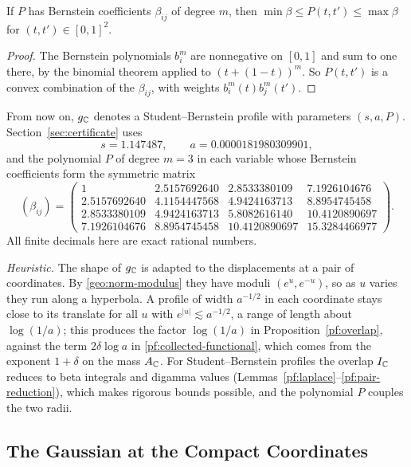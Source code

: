 \begin{lemma}\label{pf:bernstein-bounds}
If $P$ has Bernstein coefficients $\beta_{ij}$ of degree $m$, then
$\min\beta\le P(t,t')\le\max\beta$ for $(t,t')\in[0,1]^2$.
\end{lemma}

\begin{proof}
The Bernstein polynomials $b_i^m$ are nonnegative on $[0,1]$ and sum to
one there, by the binomial theorem applied to $(t+(1-t))^m$. So $P(t,t')$ is
a convex combination of the $\beta_{ij}$, with weights
$b_i^m(t)b_j^m(t')$.
\end{proof}

From now on, $g_\mathbb C$ denotes a Student--Bernstein profile with parameters
$(s,a,P)$. Section~\ref{sec:certificate} uses
\[
 s=1.147487,\qquad a=0.0000181980309901,
\]
and the polynomial $P$ of degree $m=3$ in each variable whose Bernstein
coefficients form the symmetric matrix
\begin{equation}\label{pf:bernstein-witness}
 (\beta_{ij})=\begin{pmatrix}
 1&2.5157692640&2.8533380109&7.1926104676\\
 2.5157692640&4.1154447568&4.9424163713&8.8954745458\\
 2.8533380109&4.9424163713&5.8082616140&10.4120890697\\
 7.1926104676&8.8954745458&10.4120890697&15.3284466977
 \end{pmatrix}.
\end{equation}
All finite decimals here are exact rational numbers.

\emph{Heuristic.} The shape of $g_\mathbb C$ is adapted to the displacements
at a pair of coordinates. By \eqref{geo:norm-modulus} they have moduli
$(e^u,e^{-u})$, so as $u$ varies they run along a hyperbola. A profile
of width $a^{-1/2}$ in each coordinate stays close to its translate for
all $u$ with $e^{|u|}\lesssim a^{-1/2}$, a range of length about
$\log(1/a)$; this produces the factor $\log(1/a)$ in
Proposition~\ref{pf:overlap}, against the term $2\delta\log a$ in
\eqref{pf:collected-functional}, which comes from the exponent
$1+\delta$ on the mass $A_\mathbb C$. For Student--Bernstein profiles the
overlap $I_\mathbb C$ reduces to beta integrals and digamma values
(Lemmas~\ref{pf:laplace}--\ref{pf:pair-reduction}), which makes rigorous
bounds possible, and the polynomial $P$ couples the two radii.

\subsection{The Gaussian at the Compact Coordinates}


